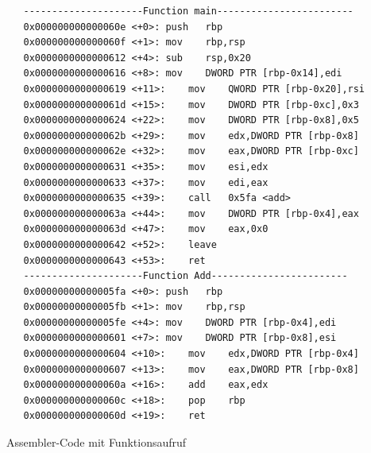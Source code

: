 \documentclass[a4paper,12pt]{article}
\begin{document}
\begin{code}[!htb]
\begin{lstlisting}
   ---------------------Function main------------------------
   0x000000000000060e <+0>:	push   rbp
   0x000000000000060f <+1>:	mov    rbp,rsp
   0x0000000000000612 <+4>:	sub    rsp,0x20
   0x0000000000000616 <+8>:	mov    DWORD PTR [rbp-0x14],edi
   0x0000000000000619 <+11>:	mov    QWORD PTR [rbp-0x20],rsi
   0x000000000000061d <+15>:	mov    DWORD PTR [rbp-0xc],0x3
   0x0000000000000624 <+22>:	mov    DWORD PTR [rbp-0x8],0x5
   0x000000000000062b <+29>:	mov    edx,DWORD PTR [rbp-0x8]
   0x000000000000062e <+32>:	mov    eax,DWORD PTR [rbp-0xc]
   0x0000000000000631 <+35>:	mov    esi,edx
   0x0000000000000633 <+37>:	mov    edi,eax
   0x0000000000000635 <+39>:	call   0x5fa <add>
   0x000000000000063a <+44>:	mov    DWORD PTR [rbp-0x4],eax
   0x000000000000063d <+47>:	mov    eax,0x0
   0x0000000000000642 <+52>:	leave  
   0x0000000000000643 <+53>:	ret      
   ---------------------Function Add------------------------
   0x00000000000005fa <+0>:	push   rbp
   0x00000000000005fb <+1>:	mov    rbp,rsp
   0x00000000000005fe <+4>:	mov    DWORD PTR [rbp-0x4],edi
   0x0000000000000601 <+7>:	mov    DWORD PTR [rbp-0x8],esi
   0x0000000000000604 <+10>:	mov    edx,DWORD PTR [rbp-0x4]
   0x0000000000000607 <+13>:	mov    eax,DWORD PTR [rbp-0x8]
   0x000000000000060a <+16>:	add    eax,edx
   0x000000000000060c <+18>:	pop    rbp
   0x000000000000060d <+19>:	ret    
\end{lstlisting}
\caption[Assembler Code Funktionen]{Assembler-Code mit Funktionsaufruf}
\label{code:funktionasm}
\end{code}


\newpage
\end{document}
